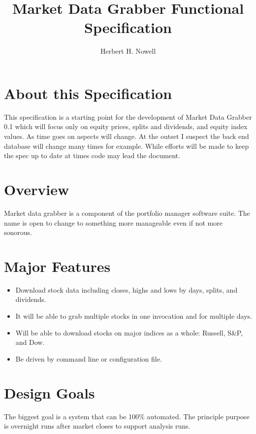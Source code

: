\documentclass{report}
\begin{document}
\title{Market Data Grabber Functional Specification}
\author{Herbert H. Nowell}

\maketitle

\section{About this Specification}

This specification is a starting point for the development of Market Data
Grabber 0.1 which will focus only on equity prices, splits and dividends, and
equity index values.  As time goes on aspects will change.  At the outset I
suspect the back end database will change many times for example.  While
efforts will be made to keep the spec up to date at times code may lead the
document.

\section{Overview}

Market data grabber is a component of the portfolio manager software suite.
The name is open to change to something more manageable even if not more
sonorous.

\section{Major Features}

\begin{itemize}
    \item Download stock data including closes, highs and lows by days, splits, 
          and dividends.  
    \item It will be able to grab multiple stocks in one invocation and for 
          multiple days.  
    \item Will be able to download stocks on major indices as a whole: Russell, 
          S\&P, and Dow.
    \item Be driven by command line or configuration file.
\end{itemize}

\section{Design Goals}

The biggest goal is a system that can be 100\% automated.  The principle purpose is
overnight runs after market closes to support analysis runs.
\end{document}
